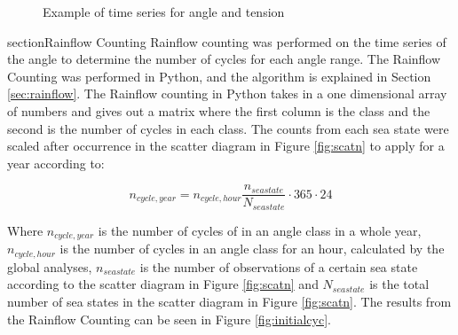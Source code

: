 \begin{figure}[H]
\hfill
{}\hfill
\caption{Example of time series for angle and tension}
\label{fig:timeex}
\end{figure}

section{Rainflow Counting}
 Rainflow counting was performed on the time series of the angle to determine the number of cycles for each angle range. The Rainflow Counting was performed in Python, and the algorithm is explained in Section \ref{sec:rainflow}. The Rainflow counting in Python takes in a one dimensional array of numbers and gives out a matrix where the first column is the class and the second is the number of cycles in each class. The counts from each sea state were scaled after occurrence in the scatter diagram in Figure \ref{fig:scatn} to apply for a year according to:

\begin{equation}
    n_{cycle,year}=n_{cycle,hour} \frac{n_{seastate}}{N_{seastate}} \cdot 365 \cdot 24 
\end{equation}

\noindent Where $n_{cycle,year}$ is the number of cycles of in an angle class in a whole year, $n_{cycle,hour}$ is the number of cycles in an angle class for an hour, calculated by the global analyses, $n_{seastate}$ is the number of observations of a certain sea state according to the scatter diagram in Figure \ref{fig:scatn} and $N_{seastate}$ is the total number of sea states in the scatter diagram in Figure \ref{fig:scatn}.\newline
\newline 
\noindent The results from the Rainflow Counting can be seen in Figure \ref{fig:initialcyc}.  

